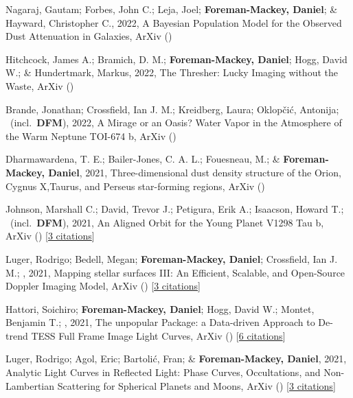 \item[{\color{numcolor}\scriptsize13}] Nagaraj, Gautam; Forbes, John C.; Leja, Joel; \textbf{Foreman-Mackey, Daniel}; \& Hayward, Christopher C., 2022, A Bayesian Population Model for the Observed Dust Attenuation in Galaxies, ArXiv ()

\item[{\color{numcolor}\scriptsize12}] Hitchcock, James A.; Bramich, D. M.; \textbf{Foreman-Mackey, Daniel}; Hogg, David W.; \& Hundertmark, Markus, 2022, The Thresher: Lucky Imaging without the Waste, ArXiv ()

\item[{\color{numcolor}\scriptsize11}] Brande, Jonathan; Crossfield, Ian J. M.; Kreidberg, Laura; Oklop{\v{c}}i{\'c}, Antonija; \etal\ (incl.\ \textbf{DFM}), 2022, A Mirage or an Oasis? Water Vapor in the Atmosphere of the Warm Neptune TOI-674 b, ArXiv ()

\item[{\color{numcolor}\scriptsize10}] Dharmawardena, T. E.; Bailer-Jones, C. A. L.; Fouesneau, M.; \& \textbf{Foreman-Mackey, Daniel}, 2021, Three-dimensional dust density structure of the Orion, Cygnus X,Taurus, and Perseus star-forming regions, ArXiv ()

\item[{\color{numcolor}\scriptsize9}] Johnson, Marshall C.; David, Trevor J.; Petigura, Erik A.; Isaacson, Howard T.; \etal\ (incl.\ \textbf{DFM}), 2021, An Aligned Orbit for the Young Planet V1298 Tau b, ArXiv () [\href{https://ui.adsabs.harvard.edu/abs/2021arXiv211010707J}{3 citations}]

\item[{\color{numcolor}\scriptsize8}] Luger, Rodrigo; Bedell, Megan; \textbf{Foreman-Mackey, Daniel}; Crossfield, Ian J. M.; \etal, 2021, Mapping stellar surfaces III: An Efficient, Scalable, and Open-Source Doppler Imaging Model, ArXiv () [\href{https://ui.adsabs.harvard.edu/abs/2021arXiv211006271L}{3 citations}]

\item[{\color{numcolor}\scriptsize7}] Hattori, Soichiro; \textbf{Foreman-Mackey, Daniel}; Hogg, David W.; Montet, Benjamin T.; \etal, 2021, The unpopular Package: a Data-driven Approach to De-trend TESS Full Frame Image Light Curves, ArXiv () [\href{https://ui.adsabs.harvard.edu/abs/2021arXiv210615063H}{6 citations}]

\item[{\color{numcolor}\scriptsize6}] Luger, Rodrigo; Agol, Eric; Bartoli{\'c}, Fran; \& \textbf{Foreman-Mackey, Daniel}, 2021, Analytic Light Curves in Reflected Light: Phase Curves, Occultations, and Non-Lambertian Scattering for Spherical Planets and Moons, ArXiv () [\href{https://ui.adsabs.harvard.edu/abs/2021arXiv210306275L}{3 citations}]

